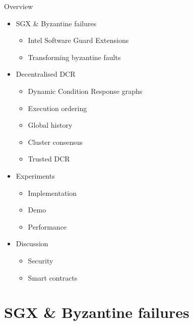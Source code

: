 \documentclass{beamer}
\begin{document}
\begin{frame}{Overview}%
	\begin{itemize}
    \item SGX \& Byzantine failures
    \begin{itemize}
      \item Intel Software Guard Extensions
      \item Transforming byzantine faults
     
    \end{itemize}
    \item Decentralised DCR
    \begin{itemize}
       \item Dynamic Condition Response graphs
      \item Execution ordering
      \item Global history
      \item Cluster consensus
      \item Trusted DCR
    \end{itemize}
    \item Experiments
    \begin{itemize}
      \item Implementation
      \item Demo
      \item Performance 
    \end{itemize}
    \item Discussion
    \begin{itemize}
      \item Security
      \item Smart contracts
    \end{itemize}
	\end{itemize}
\end{frame}

\section{SGX \& Byzantine failures}
\end{document}

